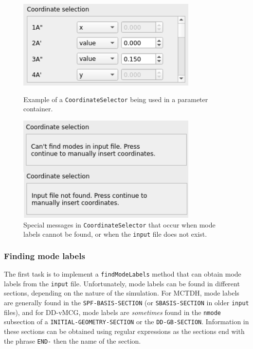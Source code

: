 \documentclass[12pt]{article}
\begin{document}
\begin{figure}[h]
    \centering
    \begin{minipage}[t]{.47\textwidth}
        \centering
        \includegraphics[width=0.8\textwidth]{img/coord_select.png}
        \caption{Example of a \texttt{CoordinateSelector} being used in a parameter container.}
        \label{fig:coord_select}
    \end{minipage}\hfill\begin{minipage}[t]{.47\textwidth}
        \centering
        \includegraphics[width=0.8\textwidth]{img/coord_select_error.png}
        \caption{Special messages in \texttt{CoordinateSelector} that occur when mode labels cannot be found, or when the \texttt{input} file does not exist.}
        \label{fig:coord_select_error}
    \end{minipage}
\end{figure}

\subsubsection{Finding mode labels}\label{sssec:findmodelabels}

The first task is to implement a \texttt{findModeLabels} method that can obtain mode labels from the \texttt{input} file. Unfortunately, mode labels can be found in different sections, depending on the nature of the simulation. For MCTDH, mode labels are generally found in the \texttt{SPF-BASIS-SECTION} (or \texttt{SBASIS-SECTION} in older \texttt{input} files), and for DD-vMCG, mode labels are \textit{sometimes} found in the \texttt{nmode} subsection of a \texttt{INITIAL-GEOMETRY-SECTION} or the \texttt{DD-GB-SECTION}. Information in these sections can be obtained using regular expressions as the sections end with the phrase \texttt{END-} then the name of the section.
\end{document}
